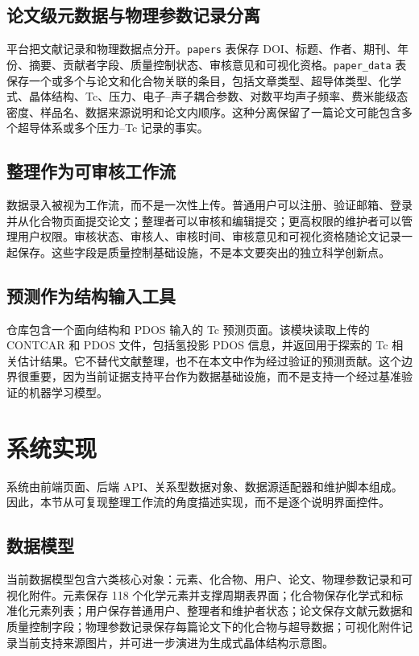 \documentclass[11pt,a4paper]{ctexart}
\begin{document}
\subsection{论文级元数据与物理参数记录分离}

平台把文献记录和物理数据点分开。\texttt{papers} 表保存 DOI、标题、作者、期刊、年份、摘要、贡献者字段、质量控制状态、审核意见和可视化资格。\texttt{paper\_data} 表保存一个或多个与论文和化合物关联的条目，包括文章类型、超导体类型、化学式、晶体结构、Tc、压力、电子--声子耦合参数、对数平均声子频率、费米能级态密度、样品名、数据来源说明和论文内顺序。这种分离保留了一篇论文可能包含多个超导体系或多个压力--Tc 记录的事实。

\subsection{整理作为可审核工作流}

数据录入被视为工作流，而不是一次性上传。普通用户可以注册、验证邮箱、登录并从化合物页面提交论文；整理者可以审核和编辑提交；更高权限的维护者可以管理用户权限。审核状态、审核人、审核时间、审核意见和可视化资格随论文记录一起保存。这些字段是质量控制基础设施，不是本文要突出的独立科学创新点。

\subsection{预测作为结构输入工具}

仓库包含一个面向结构和 PDOS 输入的 Tc 预测页面。该模块读取上传的 CONTCAR 和 PDOS 文件，包括氢投影 PDOS 信息，并返回用于探索的 Tc 相关估计结果。它不替代文献整理，也不在本文中作为经过验证的预测贡献。这个边界很重要，因为当前证据支持平台作为数据基础设施，而不是支持一个经过基准验证的机器学习模型。

\section{系统实现}

系统由前端页面、后端 API、关系型数据对象、数据源适配器和维护脚本组成。因此，本节从可复现整理工作流的角度描述实现，而不是逐个说明界面控件。

\subsection{数据模型}

当前数据模型包含六类核心对象：元素、化合物、用户、论文、物理参数记录和可视化附件。元素保存 118 个化学元素并支撑周期表界面；化合物保存化学式和标准化元素列表；用户保存普通用户、整理者和维护者状态；论文保存文献元数据和质量控制字段；物理参数记录保存每篇论文下的化合物与超导数据；可视化附件记录当前支持来源图片，并可进一步演进为生成式晶体结构示意图。
\end{document}
